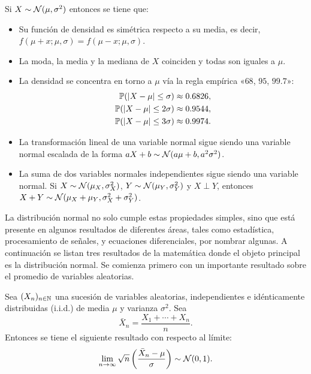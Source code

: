 \begin{proposition}
	Si \(X\sim \mathcal{N} (\mu, \sigma^2)\) entonces se tiene que:
	\begin{itemize}
		\item Su función de densidad es simétrica respecto a su media, es decir, \(f(\mu + x; \mu, \sigma) = f(\mu - x; \mu, \sigma)\).
		\item La moda, la media y la mediana de \(X\) coinciden y todas son iguales a \(\mu\).
		\item La densidad se concentra en torno a \(\mu\) vía la regla empírica «\(68\), \(95\), \(99.7\)»:
		\begin{align*}
			\mathbb{P}(\vert X - \mu \vert \leq \sigma)		& \approx 0.6826,\\
			\mathbb{P}(\vert X - \mu \vert \leq 2 \sigma)	& \approx 0.9544,\\
			\mathbb{P}(\vert X - \mu \vert \leq 3 \sigma)	& \approx 0.9974.
		\end{align*}
		\item La transformación lineal de una variable normal sigue siendo una variable normal escalada de la forma \(aX + b \sim \mathcal{N}(a \mu + b, a^2\sigma^2)\).
		\item La suma de dos variables normales independientes sigue siendo una variable normal. Si \(X\sim \mathcal{N} (\mu_X, \sigma_X^2)\), \(Y\sim \mathcal{N} (\mu_Y, \sigma_Y^2)\) y \(X \perp Y\), entonces \(X + Y \sim \mathcal{N} (\mu_X + \mu_Y, \sigma_X^2 + \sigma_Y^2)\).
	\end{itemize}
\end{proposition}

La distribución normal no solo cumple estas propiedades simples, sino que está presente en algunos resultados de diferentes áreas, tales como estadística, procesamiento de señales, y ecuaciones diferenciales, por nombrar algunas. A continuación se listan tres resultados de la matemática donde el objeto principal es la distribución normal. Se comienza primero con un importante resultado sobre el promedio de variables aleatorias.

\begin{theorem} Sea \((X_n)_{n \in \mathbb{N}}\) una sucesión de variables aleatorias, independientes e idénticamente distribuidas (i.i.d.) de media \(\mu\) y varianza \(\sigma^2\). Sea
	\[\bar{X}_{n} = \frac{X_1 + \dotsb + X_n}{n}.\]
	Entonces se tiene el siguiente resultado con respecto al límite:
	\begin{equation*}
		\lim_{n \to \infty} \sqrt{n} \left(\frac{\bar{X}_n - \mu }{\sigma}\right) \sim \mathcal{N} (0, 1).
	\end{equation*}
\end{theorem}


